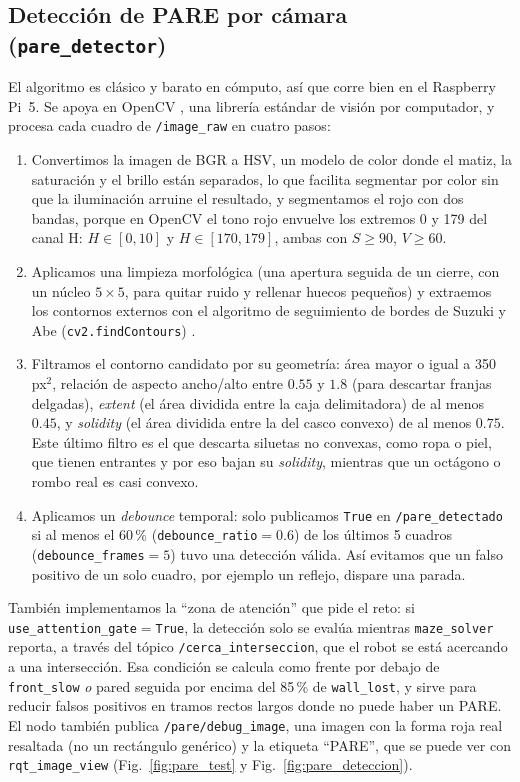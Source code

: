 \documentclass[conference]{IEEEtran}
\begin{document}
\subsection{Detección de PARE por cámara (\texttt{pare\_detector})}
El algoritmo es clásico y barato en cómputo, así que corre bien en el Raspberry Pi~5. Se apoya en OpenCV \cite{bradski2000opencv}, una librería estándar de visión por computador, y procesa cada cuadro de \texttt{/image\_raw} en cuatro pasos:
\begin{enumerate}
  \item Convertimos la imagen de BGR a HSV, un modelo de color donde el matiz, la saturación y el brillo están separados, lo que facilita segmentar por color sin que la iluminación arruine el resultado, y segmentamos el rojo con dos bandas, porque en OpenCV el tono rojo envuelve los extremos 0 y 179 del canal H: $H\in[0,10]$ y $H\in[170,179]$, ambas con $S\geq90$, $V\geq60$.
  \item Aplicamos una limpieza morfológica (una apertura seguida de un cierre, con un núcleo $5\times5$, para quitar ruido y rellenar huecos pequeños) y extraemos los contornos externos con el algoritmo de seguimiento de bordes de Suzuki y Abe (\texttt{cv2.findContours}) \cite{suzuki1985topological}.
  \item Filtramos el contorno candidato por su geometría: área mayor o igual a 350\,px$^2$, relación de aspecto ancho/alto entre $0.55$ y $1.8$ (para descartar franjas delgadas), \emph{extent} (el área dividida entre la caja delimitadora) de al menos $0.45$, y \emph{solidity} (el área dividida entre la del casco convexo) de al menos $0.75$. Este último filtro es el que descarta siluetas no convexas, como ropa o piel, que tienen entrantes y por eso bajan su \emph{solidity}, mientras que un octágono o rombo real es casi convexo.
  \item Aplicamos un \emph{debounce} temporal: solo publicamos \texttt{True} en \texttt{/pare\_detectado} si al menos el 60\,\% (\texttt{debounce\_ratio}$=0.6$) de los últimos 5 cuadros (\texttt{debounce\_frames}$=5$) tuvo una detección válida. Así evitamos que un falso positivo de un solo cuadro, por ejemplo un reflejo, dispare una parada.
\end{enumerate}
También implementamos la ``zona de atención'' que pide el reto: si \texttt{use\_attention\_gate}$=$\texttt{True}, la detección solo se evalúa mientras \texttt{maze\_solver} reporta, a través del tópico \texttt{/cerca\_interseccion}, que el robot se está acercando a una intersección. Esa condición se calcula como frente por debajo de \texttt{front\_slow} \emph{o} pared seguida por encima del 85\,\% de \texttt{wall\_lost}, y sirve para reducir falsos positivos en tramos rectos largos donde no puede haber un PARE. El nodo también publica \texttt{/pare/debug\_image}, una imagen con la forma roja real resaltada (no un rectángulo genérico) y la etiqueta ``PARE'', que se puede ver con \texttt{rqt\_image\_view} (Fig.~\ref{fig:pare_test} y Fig.~\ref{fig:pare_deteccion}).
\end{document}
